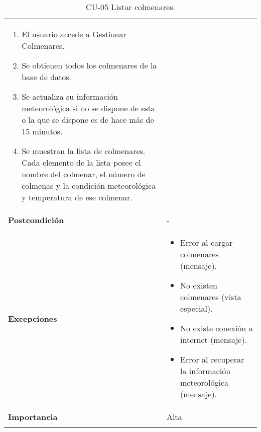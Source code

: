 \begin{longtable}[H]{@{}ll@{}}
\begin{minipage}[t]{0.68\columnwidth}
\begin{enumerate}
\def\labelenumi{\arabic{enumi}.}
\tightlist
\item
  El usuario accede a Gestionar Colmenares.
\item
  Se obtienen todos los colmenares de la base de datos.
\item
  Se actualiza su información meteorológica si no se dispone de esta o
  la que se dispone es de hace más de 15 minutos.
\item
  Se muestran la lista de colmenares. Cada elemento de la lista posee el
  nombre del colmenar, el número de colmenas y la condición
  meteorológica y temperatura de ese colmenar.
\end{enumerate}\strut
\end{minipage}\tabularnewline
\begin{minipage}[t]{0.26\columnwidth}\raggedright\strut
\textbf{Postcondición}\strut
\end{minipage} & \begin{minipage}[t]{0.68\columnwidth}\raggedright\strut
-\strut
\end{minipage}\tabularnewline
\begin{minipage}[t]{0.26\columnwidth}\raggedright\strut
\textbf{Excepciones}\strut
\end{minipage} & \begin{minipage}[t]{0.68\columnwidth}\raggedright\strut
\begin{itemize}
\tightlist
\item
  Error al cargar colmenares (mensaje).
\item
  No existen colmenares (vista especial).
\item
  No existe conexión a internet (mensaje).
\item
  Error al recuperar la información meteorológica (mensaje).
\end{itemize}\strut
\end{minipage}\tabularnewline
\begin{minipage}[t]{0.26\columnwidth}\raggedright\strut
\textbf{Importancia}\strut
\end{minipage} & \begin{minipage}[t]{0.68\columnwidth}\raggedright\strut
Alta\strut
\end{minipage}\tabularnewline
\bottomrule
\caption{CU-05 Listar colmenares.}
\end{longtable}

